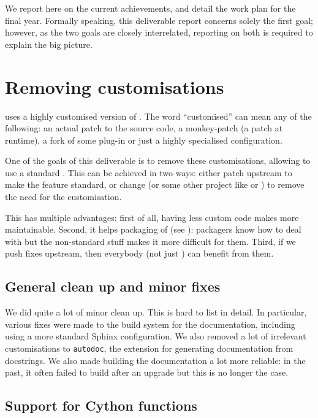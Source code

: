 \documentclass{deliverablereport}
\begin{document}
We report here on the current achievements, and detail the work plan for the
final year. Formally speaking, this deliverable report concerns solely the
first goal; however, as the two goals are closely interrelated, reporting on
both is required to explain the big picture.

\section{Removing \Sage customisations}

\Sage uses a highly customised version of \Sphinx.
The word ``customised'' can mean any of the following:
an actual patch to the source code,
a monkey-patch (a patch at runtime),
a fork of some plug-in or just a highly specialised configuration.

One of the goals of this deliverable is to remove these
customisations, allowing \Sage to use a standard \Sphinx.
This can be achieved in two ways:
either patch upstream \Sphinx to make the feature standard,
or change \Sage (or some other project like \Cython or \Python)
to remove the need for the customisation.

This has multiple advantages:
first of all, having less custom code makes \Sage more maintainable.
Second, it helps packaging of \Sage
(see ):
packagers know how to deal with \Sphinx
but the non-standard \Sage stuff makes it more difficult for them.
Third, if we push fixes upstream, then everybody (not just \Sage)
can benefit from them.

\subsection{General clean up and minor fixes}

We did quite a lot of minor clean up.
This is hard to list in detail.
In particular, various fixes were made to the build system for the documentation,
including using a more standard Sphinx configuration.
We also removed a lot of irrelevant customisations to \texttt{autodoc},
the extension for generating documentation from docstrings.
We also made building the \Sage documentation a lot more reliable:
in the past, it often failed to build after an upgrade
but this is no longer the case.

\subsection{Support for Cython functions}\label{cython}
\end{document}
